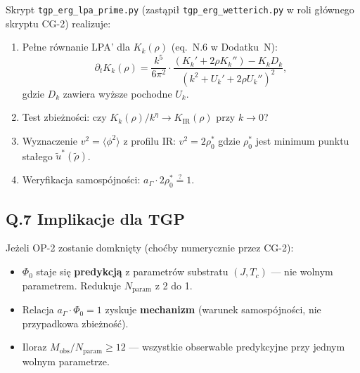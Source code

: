 Skrypt \texttt{tgp\_erg\_lpa\_prime.py} (zastąpił
\texttt{tgp\_erg\_wetterich.py} w roli głównego skryptu CG-2) realizuje:
\begin{enumerate}
  \item Pełne równanie LPA' dla $K_k(\rho)$ (eq.~N.6 w Dodatku~N):
        \begin{equation}
          \partial_t K_k(\rho) = \frac{k^5}{6\pi^2} \cdot
          \frac{(K_k' + 2\rho K_k'') - K_k D_k}{(k^2 + U_k' + 2\rho U_k'')^2},
        \end{equation}
        gdzie $D_k$ zawiera wyższe pochodne $U_k$.
  \item Test zbieżności: czy $K_k(\rho)/k^\eta \to K_\mathrm{IR}(\rho)$ przy $k \to 0$?
  \item Wyznaczenie $v^2 = \langle\phi^2\rangle$ z profilu IR: $v^2 = 2\rho_0^*$
        gdzie $\rho_0^*$ jest minimum punktu stałego $\tilde u^*(\tilde\rho)$.
  \item Weryfikacja samospójności: $a_\Gamma \cdot 2\rho_0^* \stackrel{?}{=} 1$.
\end{enumerate}

\subsection*{Q.7 Implikacje dla TGP}

Jeżeli OP-2 zostanie domknięty (choćby numerycznie przez CG-2):
\begin{itemize}
  \item $\Phi_0$ staje się \textbf{predykcją} z parametrów substratu $(J, T_c)$
        — nie wolnym parametrem. Redukuje $N_\mathrm{param}$ z 2 do 1.
  \item Relacja $a_\Gamma \cdot \Phi_0 = 1$ zyskuje \textbf{mechanizm}
        (warunek samospójności, nie przypadkowa zbieżność).
  \item Iloraz $M_\mathrm{obs}/N_\mathrm{param} \geq 12$ — wszystkie
        obserwable predykcyjne przy jednym wolnym parametrze.
\end{itemize}

\bigskip
\begin{center}
\end{center}

